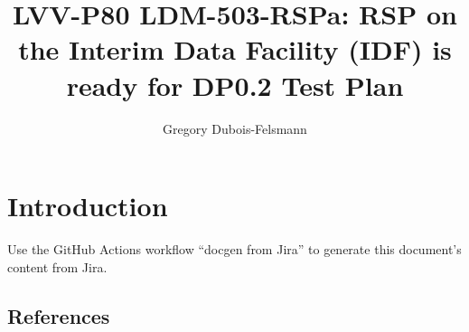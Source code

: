 \documentclass[DM,lsstdraft,toc]{lsstdoc}
\begin{document}
\def\milestoneName{LDM-503-RSPa: RSP on the Interim Data Facility (IDF) is ready for DP0.2}
\def\milestoneId{LVV-P80}
\def\product{Data Management}


\title{LVV-P80 LDM-503-RSPa: RSP on the Interim Data Facility (IDF) is ready for DP0.2 Test Plan }
\setDocRef{\lsstDocType-\lsstDocNum}
\date{\vcsDate}
\author{Gregory Dubois-Felsmann}




\maketitle

\section{Introduction}
Use the GitHub Actions workflow ``docgen from Jira'' to generate this document's content from Jira.

\subsection{References}
\label{sect:references}
\renewcommand{\refname}{}




\end{document}
